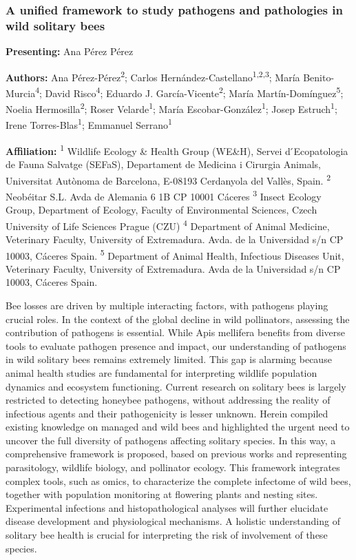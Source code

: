 \documentclass[
  letterpaper,
  DIV=11,
  numbers=noendperiod]{scrartcl}
\begin{document}
\subsubsection{A unified framework to study pathogens and pathologies in
wild solitary
bees}\label{a-unified-framework-to-study-pathogens-and-pathologies-in-wild-solitary-bees}

\textbf{Presenting:} Ana Pérez Pérez

\textbf{Authors:} Ana Pérez-Pérez\textsuperscript{2}; Carlos
Hernández-Castellano\textsuperscript{1,2,3}; María
Benito-Murcia\textsuperscript{4}; David Risco\textsuperscript{4};
Eduardo J. García-Vicente\textsuperscript{2}; María
Martín-Domínguez\textsuperscript{5}; Noelia
Hermosilla\textsuperscript{2}; Roser Velarde\textsuperscript{1}; María
Escobar-González\textsuperscript{1}; Josep Estruch\textsuperscript{1};
Irene Torres-Blas\textsuperscript{1}; Emmanuel
Serrano\textsuperscript{1}

\textbf{Affiliation:} \textsuperscript{1} Wildlife Ecology \& Health
Group (WE\&H), Servei d ́Ecopatologia de Fauna Salvatge (SEFaS),
Departament de Medicina i Cirurgia Animals, Universitat Autònoma de
Barcelona, E-08193 Cerdanyola del Vallès, Spain. \textsuperscript{2}
Neobéitar S.L. Avda de Alemania 6 1B CP 10001 Cáceres
\textsuperscript{3} Insect Ecology Group, Department of Ecology, Faculty
of Environmental Sciences, Czech University of Life Sciences Prague
(CZU) \textsuperscript{4} Department of Animal Medicine, Veterinary
Faculty, University of Extremadura. Avda. de la Universidad s/n CP
10003, Cáceres Spain. \textsuperscript{5} Department of Animal Health,
Infectious Diseases Unit, Veterinary Faculty, University of Extremadura.
Avda de la Universidad s/n CP 10003, Cáceres Spain.

Bee losses are driven by multiple interacting factors, with pathogens
playing crucial roles. In the context of the global decline in wild
pollinators, assessing the contribution of pathogens is essential. While
Apis mellifera benefits from diverse tools to evaluate pathogen presence
and impact, our understanding of pathogens in wild solitary bees remains
extremely limited. This gap is alarming because animal health studies
are fundamental for interpreting wildlife population dynamics and
ecosystem functioning. Current research on solitary bees is largely
restricted to detecting honeybee pathogens, without addressing the
reality of infectious agents and their pathogenicity is lesser unknown.
Herein compiled existing knowledge on managed and wild bees and
highlighted the urgent need to uncover the full diversity of pathogens
affecting solitary species. In this way, a comprehensive framework is
proposed, based on previous works and representing parasitology,
wildlife biology, and pollinator ecology. This framework integrates
complex tools, such as omics, to characterize the complete infectome of
wild bees, together with population monitoring at flowering plants and
nesting sites. Experimental infections and histopathological analyses
will further elucidate disease development and physiological mechanisms.
A holistic understanding of solitary bee health is crucial for
interpreting the risk of involvement of these species.
\end{document}

